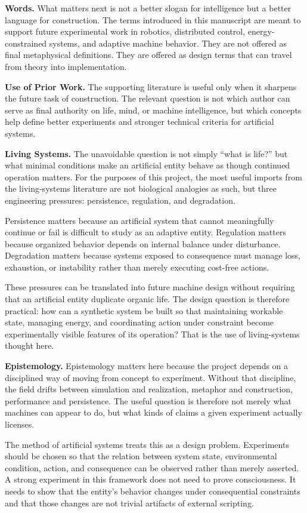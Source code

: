 \documentclass[a4paper,english]{article}
\begin{document}
\textbf{Words.} What matters next is not a better slogan for intelligence but a better
language for construction. The terms introduced in this manuscript
are meant to support future experimental work in robotics, distributed
control, energy-constrained systems, and adaptive machine behavior.
They are not offered as final metaphysical definitions. They are offered
as design terms that can travel from theory into implementation.

\textbf{Use of Prior Work.} The supporting literature is useful only when it sharpens the future
task of construction. The relevant question is not which author can
serve as final authority on life, mind, or machine intelligence, but
which concepts help define better experiments and stronger technical
criteria for artificial systems.

\textbf{Living Systems.} The unavoidable question is not simply ``what is life?'' but what
minimal conditions make an artificial entity behave as though continued
operation matters. For the purposes of this project, the most useful
imports from the living-systems literature are not biological analogies
as such, but three engineering pressures: persistence, regulation,
and degradation.

Persistence matters because an artificial system that cannot meaningfully
continue or fail is difficult to study as an adaptive entity. Regulation
matters because organized behavior depends on internal balance under
disturbance. Degradation matters because systems exposed to consequence
must manage loss, exhaustion, or instability rather than merely executing
cost-free actions.

These pressures can be translated into future machine design without
requiring that an artificial entity duplicate organic life. The design
question is therefore practical: how can a synthetic system be built
so that maintaining workable state, managing energy, and coordinating
action under constraint become experimentally visible features of
its operation? That is the use of living-systems thought here.

\textbf{Epistemology.} Epistemology matters here because the project depends on a disciplined
way of moving from concept to experiment. Without that discipline,
the field drifts between simulation and realization, metaphor and
construction, performance and persistence. The useful question is
therefore not merely what machines can appear to do, but what kinds
of claims a given experiment actually licenses.

The method of artificial systems treats this as a design problem.
Experiments should be chosen so that the relation between system state,
environmental condition, action, and consequence can be observed rather
than merely asserted. A strong experiment in this framework does not
need to prove consciousness. It needs to show that the entity's behavior
changes under consequential constraints and that those changes are
not trivial artifacts of external scripting.
\end{document}
